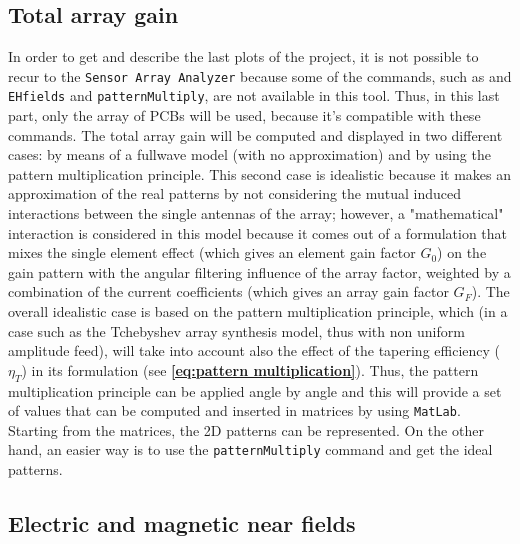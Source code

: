 \documentclass[10pt,a4paper,twocolumn]{article}
\begin{document}
{\subsection*{Total array gain}
In order to get and describe the last plots of the project, it is not possible to recur to the \texttt{\color{Mahogany}Sensor Array Analyzer} because some of the commands, such as  and \texttt{\color{Turquoise}EHfields} and \texttt{\color{Turquoise}patternMultiply}, are not available in this tool. Thus, in this last part, only the array of PCBs will be used, because it's compatible with these commands. The total array gain will be computed and displayed in two different cases: by means of a fullwave model (with no approximation) and by using the pattern multiplication principle. This second case is idealistic because it makes an approximation of the real patterns by not considering the mutual induced interactions between the single antennas of the array; however, a "mathematical" interaction is considered in this model because it comes out of a formulation that mixes the single element effect (which gives an element gain factor $G_0$) on the gain pattern with the angular filtering influence of the array factor, weighted by a combination of the current coefficients (which gives an array gain factor $G_F$). The overall idealistic case is based on the pattern multiplication principle, which (in a case such as the Tchebyshev array synthesis model, thus with non uniform amplitude feed), will take into account also the effect of the tapering efficiency ($\eta_T$) in its formulation (see \textbf{\cref{eq:pattern multiplication}}). Thus, the pattern multiplication principle can be applied angle by angle and this will provide a set of values that can be computed and inserted in matrices by using \texttt{\color{BurntOrange}MatLab}. Starting from the matrices, the 2D patterns can be represented. On the other hand, an easier way is to use the \texttt{\color{Turquoise}patternMultiply} command and get the ideal patterns. 


\subsection*{Electric and magnetic near fields}



}
\end{document}
